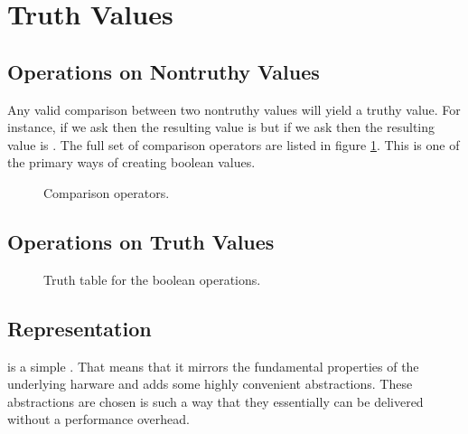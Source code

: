 \section{Truth Values}


\subsection{Operations on Nontruthy Values}

Any valid comparison between two nontruthy values will yield a truthy value. For instance, if we ask  then the resulting value is  but if we ask  then the resulting value is . The full set of comparison operators are listed in figure \ref{fig:prim:bool:comparison}. This is one of the primary ways of creating boolean values.

\begin{figure}[tbp]
  
  \caption{Comparison operators.}
  \label{fig:prim:bool:comparison}
\end{figure}

\subsection{Operations on Truth Values}

\begin{figure}[tbp]
  
  \caption{Truth table for the boolean operations.}
  \label{fig:prim:bool:and}
\end{figure}


\subsection{Representation}


\csharpsubsection{\csharp}



 is a simple . That means that it mirrors the fundamental properties of the underlying harware and adds some highly convenient abstractions. These abstractions are chosen is such a way that they essentially can be delivered without a performance overhead.

